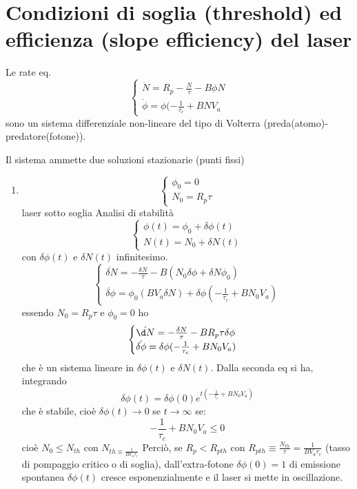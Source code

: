 \section*{Condizioni di soglia (threshold) ed efficienza (slope efficiency) del laser}
Le rate eq.
\begin{equation*}
\begin{cases}
\dot{N} = R_p - \frac{N}{\tau} - B\phi N\\
\dot{\phi} = \phi(-\frac{1}{\tau_c} + BN V_a
\end{cases}
\end{equation*}
sono un sistema differenziale non-lineare del tipo di Volterra (preda(atomo)-predatore(fotone)).

Il sistema ammette due soluzioni stazionarie (punti fissi)
\begin{enumerate}
\item \begin{equation*}
\begin{cases}
\phi_0 = 0\\
N_0 = R_p \tau
\end{cases}
\end{equation*}laser sotto soglia
Analisi di stabilità
\begin{equation*}
\begin{cases}
\phi(t) = \phi_0 + \delta \phi(t)\\
N(t) = N_0 + \delta N(t)
\end{cases}
\end{equation*}
con $\delta \phi(t)$ e $\delta N(t)$ infinitesimo.
\begin{equation*}
\begin{cases}
\dot{\delta N} = -\frac{\delta N}{\tau} - B(N_0 \delta \phi + \delta N \phi_0)\\
\dot{\delta \phi} = \phi_0(BV_a \delta N) + \delta\phi(-\frac{1}{\tau_c} + BN_0V_a)
\end{cases}
\end{equation*}
essendo $N_0 = R_p\tau$ e $\phi_0 = 0$ ho
\begin{equation*}
\begin{cases}
\dot{\d N} = -\frac{\delta N}{\tau} - B R_p \tau \delta \phi\\
\dot{\delta \phi} = \delta\phi(-\frac{1}{\tau_c} + BN_0V_a) 
\end{cases}
\end{equation*}
che è un sistema lineare in $\delta \phi(t)$ e $\delta N(t)$. Dalla seconda eq si ha, integrando
\begin{equation*}
\delta \phi(t) = \delta\phi(0) e^{t(-\frac{1}{\tau_c} + BN_0V_a)}
\end{equation*}
che è stabile, cioè $\delta \phi(t) \rightarrow 0$ se $t \rightarrow \infty$ se:
\begin{equation*}
-\frac{1}{\tau_c} + BN_0V_a \leq 0
\end{equation*}
cioè $ N_0 \leq N_{th}$ con $N_{th \equiv \frac{1}{BV_a \tau_c}}$
Perciò, se $R_p < R_{pth}$ con $R_{pth} \equiv \frac{N_{th}}{\tau} = \frac{1}{BV_a \tau_c}$ (tasso di pompaggio critico o di soglia), dall'extra-fotone $\delta\phi(0) = 1$ di emissione spontanea $\delta\phi(t)$ cresce esponenzialmente e il laser si mette in oscillazione.
\end{enumerate}

